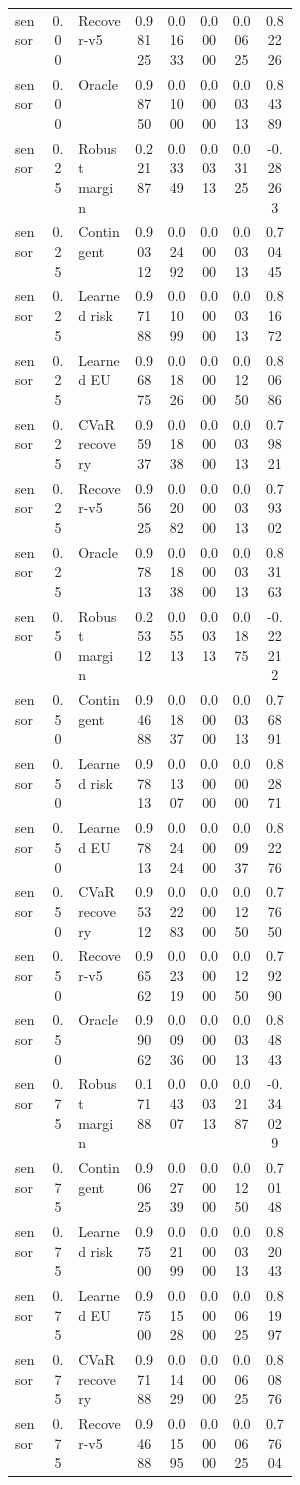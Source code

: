 \documentclass{article}
\begin{document}
\begin{center}
\begin{longtable}{p{0.13\linewidth}cp{0.20\linewidth}ccccc}
sensor & 0.00 & Recover-v5 & 0.98125 & 0.01633 & 0.00000 & 0.00625 & 0.82226\\
sensor & 0.00 & Oracle & 0.98750 & 0.01000 & 0.00000 & 0.00313 & 0.84389\\
sensor & 0.25 & Robust margin & 0.22187 & 0.03349 & 0.00313 & 0.03125 & -0.28263\\
sensor & 0.25 & Contingent & 0.90312 & 0.02492 & 0.00000 & 0.00313 & 0.70445\\
sensor & 0.25 & Learned risk & 0.97188 & 0.01099 & 0.00000 & 0.00313 & 0.81672\\
sensor & 0.25 & Learned EU & 0.96875 & 0.01826 & 0.00000 & 0.01250 & 0.80686\\
sensor & 0.25 & CVaR recovery & 0.95937 & 0.01838 & 0.00000 & 0.00313 & 0.79821\\
sensor & 0.25 & Recover-v5 & 0.95625 & 0.02082 & 0.00000 & 0.00313 & 0.79302\\
sensor & 0.25 & Oracle & 0.97813 & 0.01838 & 0.00000 & 0.00313 & 0.83163\\
sensor & 0.50 & Robust margin & 0.25312 & 0.05513 & 0.00313 & 0.01875 & -0.22212\\
sensor & 0.50 & Contingent & 0.94688 & 0.01837 & 0.00000 & 0.00313 & 0.76891\\
sensor & 0.50 & Learned risk & 0.97813 & 0.01307 & 0.00000 & 0.00000 & 0.82871\\
sensor & 0.50 & Learned EU & 0.97813 & 0.02424 & 0.00000 & 0.00937 & 0.82276\\
sensor & 0.50 & CVaR recovery & 0.95312 & 0.02283 & 0.00000 & 0.01250 & 0.77650\\
sensor & 0.50 & Recover-v5 & 0.96562 & 0.02319 & 0.00000 & 0.01250 & 0.79290\\
sensor & 0.50 & Oracle & 0.99062 & 0.00936 & 0.00000 & 0.00313 & 0.84843\\
sensor & 0.75 & Robust margin & 0.17188 & 0.04307 & 0.00313 & 0.02187 & -0.34029\\
sensor & 0.75 & Contingent & 0.90625 & 0.02739 & 0.00000 & 0.01250 & 0.70148\\
sensor & 0.75 & Learned risk & 0.97500 & 0.02199 & 0.00000 & 0.00313 & 0.82043\\
sensor & 0.75 & Learned EU & 0.97500 & 0.01528 & 0.00000 & 0.00625 & 0.81997\\
sensor & 0.75 & CVaR recovery & 0.97188 & 0.01429 & 0.00000 & 0.00625 & 0.80876\\
sensor & 0.75 & Recover-v5 & 0.94688 & 0.01595 & 0.00000 & 0.00625 & 0.77604\\

\end{longtable}
\end{center}
\end{document}
